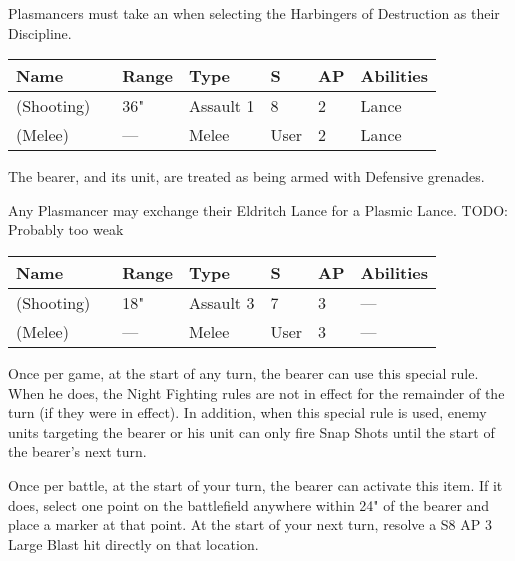
Plasmancers must take an  when selecting the Harbingers of Destruction as their Discipline.

\label{Eldritch Lance}
\noindent
\begin{tabular}{||m{130pt} m{10pt} m{31pt} m{55pt} m{12pt} m{12pt} m{210pt}||}
	\hline
	Name & & Range & Type & S & AP & Abilities \\
	\hline
	\quickref{Eldritch Lance} (Shooting) & & 36" & Assault 1 & 8 & 2 & Lance \\
	\quickref{Eldritch Lance} (Melee) & & — & Melee & User & 2 & Lance \\
	\hline
\end{tabular}


The bearer, and its unit, are treated as being armed with Defensive grenades.


Any Plasmancer may exchange their Eldritch Lance for a Plasmic Lance.
TODO: Probably too weak

\label{Plasmic Lance}
\noindent
\begin{tabular}{||m{130pt} m{10pt} m{31pt} m{55pt} m{12pt} m{12pt} m{210pt}||}
	\hline
	Name & & Range & Type & S & AP & Abilities \\
	\hline
	\quickref{Plasmic Lance} (Shooting) & & 18" & Assault 3 & 7 & 3 & — \\
	\quickref{Plasmic Lance} (Melee) & & — & Melee & User & 3 & — \\
	\hline
\end{tabular}


Once per game, at the start of any turn, the bearer can use this special rule. When he does, the Night Fighting rules are not in effect for the remainder of the turn (if they were in effect). In addition, when this special rule is used, enemy units targeting the bearer or his unit can only fire Snap Shots until the start of the bearer’s next turn.


Once per battle, at the start of your turn, the bearer can activate this item. If it does, select one point on the battlefield anywhere within 24" of the bearer and place a marker at that point. At the start of your next turn, resolve a S8 AP 3 Large Blast hit directly on that location.


